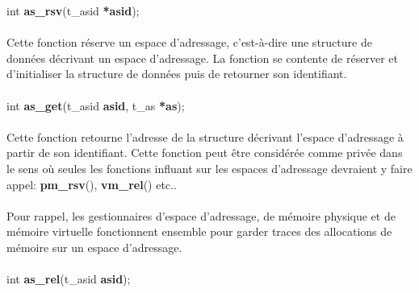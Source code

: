 \documentclass[10pt,a4wide]{article}
\begin{document}
\hspace{1.5cm}int \textbf{as\_rsv}(t\_asid \textbf{*asid});

\paragraph{}

Cette fonction r\'eserve un espace d'adressage, c'est-\`a-dire une structure
de donn\'ees d\'ecrivant un espace d'adressage. La fonction se contente
de r\'eserver et d'initialiser la structure de donn\'ees puis de retourner
son identifiant.

\paragraph{}

\hspace{1.5cm}int \textbf{as\_get}(t\_asid \textbf{asid},
                                   t\_as \textbf{*as});

\paragraph{}

Cette fonction retourne l'adresse de la structure d\'ecrivant l'espace
d'adressage \`a partir de son identifiant. Cette fonction peut \^etre
consid\'er\'ee comme priv\'ee dans le sens o\`u seules les fonctions
influant sur les espaces d'adressage devraient y faire appel:
\textbf{pm\_rsv}(), \textbf{vm\_rel}() etc..

\paragraph{}

Pour rappel, les gestionnaires d'espace d'adressage, de m\'emoire physique
et de m\'emoire virtuelle fonctionnent ensemble pour garder traces des
allocations de m\'emoire sur un espace d'adressage.

\paragraph{}

\hspace{1.5cm}int \textbf{as\_rel}(t\_asid \textbf{asid});

\paragraph{}
\end{document}
